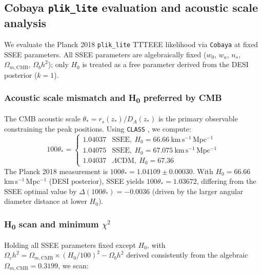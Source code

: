 \documentclass[12pt,a4paper]{article}
\begin{document}
\subsection{Cobaya \texttt{plik\_lite} evaluation and acoustic scale analysis}
\label{sec:cobaya}

We evaluate the Planck 2018 \texttt{plik\_lite} TTTEEE likelihood \citep{PlanckLikelihood2020} via \texttt{Cobaya} \citep{Torrado2021} at fixed SSEE parameters. All SSEE parameters are algebraically fixed ($w_0$, $w_a$, $n_s$, $\Omega_{m,\mathrm{CMB}}$, $\Omega_b h^2$); only $H_0$ is treated as a free parameter derived from the DESI posterior ($k=1$).

\subsubsection*{Acoustic scale mismatch and H\textsubscript{0} preferred by CMB}

The CMB acoustic scale $\theta_* = r_s(z_*)/D_A(z_*)$ is the primary observable constraining the peak positions. Using \texttt{CLASS} \citep{Lesgourgues2011}, we compute:
\begin{equation}
  100\theta_* = \begin{cases}
    1.04037 & \text{SSEE},\ H_0 = 66.66\ \mathrm{km\,s^{-1}\,Mpc^{-1}} \\
    1.04075 & \text{SSEE},\ H_0 = 67.075\ \mathrm{km\,s^{-1}\,Mpc^{-1}} \\
    1.04037 & \Lambda\mathrm{CDM},\ H_0 = 67.36
  \end{cases}
\end{equation}
The Planck 2018 measurement is $100\theta_* = 1.04109\pm 0.00030$. With $H_0=66.66$ km\,s$^{-1}$\,Mpc$^{-1}$ (DESI posterior), SSEE yields $100\theta_* = 1.03672$, differing from the SSEE optimal value by $\Delta(100\theta_*)=-0.0036$ (driven by the larger angular diameter distance at lower $H_0$).

\subsubsection*{H\textsubscript{0} scan and minimum $\chi^2$}

Holding all SSEE parameters fixed except $H_0$, with $\Omega_c h^2 = \Omega_{m,\mathrm{CMB}}\times(H_0/100)^2 - \Omega_b h^2$ derived consistently from the algebraic $\Omega_{m,\mathrm{CMB}}=0.3199$, we scan:
\end{document}
